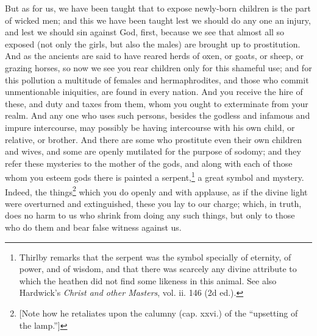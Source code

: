 
But as for us, we have been taught that to expose newly-born children is the part of wicked men; and this we have been taught lest we should do any one an injury, and lest we should sin against God, first, because we see that almost all so exposed (not only the girls, but also the males) are brought up to prostitution. And as the ancients are said to have reared herds of oxen, or goats, or sheep, or grazing horses, so now we see you rear children only for this shameful use; and for this pollution a multitude of females and hermaphrodites, and those who commit unmentionable iniquities, are found in every nation. And you receive the hire of these, and duty and taxes from them, whom you ought to exterminate from your realm. And any one who uses such persons, besides the godless and infamous and impure intercourse, may possibly be having intercourse with his own child, or relative, or brother. And there are some who prostitute even their own children and wives, and some are openly mutilated for the purpose of sodomy; and they refer these mysteries to the mother of the gods, and along with each of those whom you esteem gods there is painted a serpent,\footnote{Thirlby remarks that the serpent was the symbol specially of eternity, of power, and of wisdom, and that there was scarcely any divine attribute to which the heathen did not find some likeness in this animal. See also Hardwick’s \emph{Christ and other Masters}, vol. ii. 146 (2d ed.).} a great symbol and mystery. Indeed, the things\footnote{[Note how he retaliates upon the calumny (cap. xxvi.) of the “upsetting of the lamp.”]} which you do openly and with applause, as if the divine light were overturned and extinguished, these you lay to our charge; which, in truth, does no harm to us who shrink from doing any such things, but only to those who do them and bear false witness against us.



